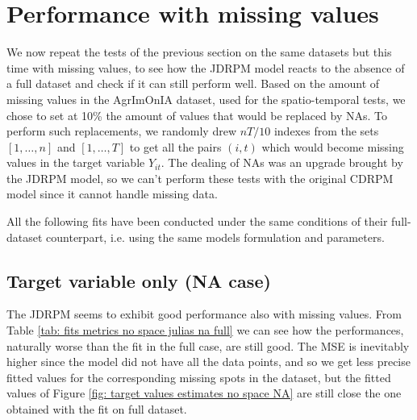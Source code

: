 \documentclass[12pt,	%
	a4paper,		%
	twoside,		%
	openright,		%
	titlepage,%
	]{book}
\theoremstyle{definition}
\begin{document}



\section{Performance with missing values}
We now repeat the tests of the previous section on the same datasets but this time with missing values, to see how the JDRPM model reacts to the absence of a full dataset and check if it can still perform well. Based on the amount of missing values in the AgrImOnIA dataset, used for the spatio-temporal tests, we chose to set at 10\% the amount of values that would be replaced by NAs. To perform such replacements, we randomly drew $nT/10$ indexes from the sets $[1,\ldots,n]$ and $[1,\ldots,T]$ to get all the pairs $(i,t)$ which would become missing values in the target variable $Y_{it}$. The dealing of NAs was an upgrade brought by the JDRPM model, so we can't perform these tests with the original CDRPM model since it cannot handle missing data. 

All the following fits have been conducted under the same conditions of their full-dataset counterpart, i.e. using the same models formulation and parameters.

\subsection{Target variable only (NA case)}
The JDRPM seems to exhibit good performance also with missing values. From Table \ref{tab: fits metrics no space julias na full} we can see how the performances, naturally worse than the fit in the full case, are still good. The MSE is inevitably higher since the model did not have all the data points, and so we get less precise fitted values for the corresponding missing spots in the dataset, but the fitted values of Figure \ref{fig: target values estimates no space NA} are still close the one obtained with the fit on full dataset.
\end{document}
